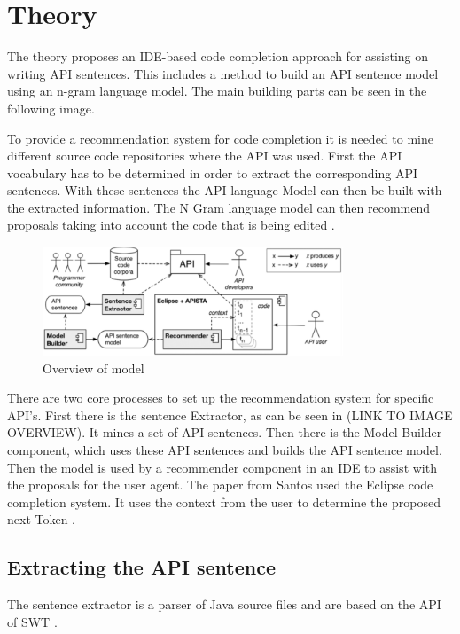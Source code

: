 \section{Theory}
The theory proposes an IDE-based code completion approach for assisting on writing API sentences. This includes a method to build an API sentence model using an n-gram language model. The main building parts can be seen in the following image. 

To provide a recommendation system for code completion it is needed to mine different source code repositories where the API was used. First the API vocabulary has to be determined in order to extract the corresponding API sentences. With these sentences the API language Model can then be built with the extracted information. The N Gram language model can then recommend proposals taking into account the code that is being edited \cite{Santos2017stepwise}. 

\begin{figure}[H]
	\centering
	\includegraphics[width=0.8\textwidth]{./section-chapter1/images/overview.png}
	\caption{Overview of model}
	\label{fig:overview}
\end{figure}

There are two core processes to set up the recommendation system for specific API's. First there is the sentence Extractor, as can be seen in (LINK TO IMAGE OVERVIEW). It mines a set of API sentences. Then there is the Model Builder component, which uses these API sentences and builds the API sentence model. Then the model is used by a recommender component in an IDE to assist with the proposals for the user agent. The paper from Santos used the Eclipse code completion system. It uses the context from the user to determine the proposed next Token \cite{Santos2017stepwise}. 
\subsection{Extracting the API sentence}
The sentence extractor is a parser of Java source files and are based on the API of SWT \cite{Santos2017stepwise}. 

